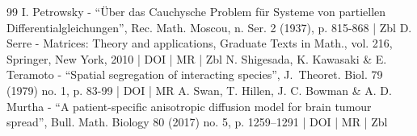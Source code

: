 \documentclass[10pt]{amsart}
\theoremstyle{definition}
\begin{document}
\begin{thebibliography}{99}
I. Petrowsky - “Über das Cauchysche Problem für Systeme von partiellen Differentialgleichungen”, Rec. Math. Moscou, n. Ser. 2 (1937), p. 815-868 | Zbl
D. Serre - Matrices: Theory and applications, Graduate Texts in Math., vol. 216, Springer, New York, 2010 | DOI | MR | Zbl
N. Shigesada, K. Kawasaki \& E. Teramoto - “Spatial segregation of interacting species”, J. Theoret. Biol. 79 (1979) no. 1, p. 83-99 | DOI | MR
A. Swan, T. Hillen, J. C. Bowman \& A. D. Murtha - “A patient-specific anisotropic diffusion model for brain tumour spread”, Bull. Math. Biology 80 (2017) no. 5, p. 1259–1291 | DOI | MR | Zbl
\end{thebibliography}
\end{document}
